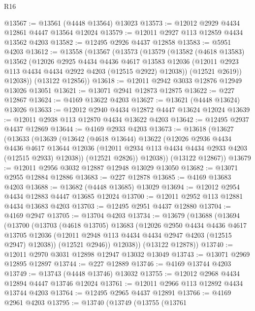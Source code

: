 \begin{lexlean}{R16}
\begin{coremodule}
@13567 := @13561 (@4448 @13564) @13023
@13573 := @12012 @2929 @4434 @12861 @4447 @13564 @12024
@13579 := @12011 @2927 @113 @12859 @4434 @13562 @4203
@13582 := @12495 @2926 @4437 @12858
@13583 := @5951 @4203
@13612 := @13558
    (@13567
      (@13573
        (@13579
          (@13582
            (@4618 @13583)
            @13562
            (@12026
              @2925
              @4434
              @4436
              @4617
              @13583
              @12036
              (@12011 @2923 @113 @4434 @4434 @2922 @4203 (@12515 @2922) @12038))
            (@12521 @2619))
          @12038))
      (@13122 @12856))
@13618 := @12011 @2942 @3033 @12876 @12949 @13026 @13051
@13621 := @13071 @2941 @12873 @12875
@13622 := @227 @12867
@13624 := @4169 @13622 @4203
@13627 := @13621 (@4448 @13624) @13026
@13633 := @12012 @2940 @4434 @12872 @4447 @13624 @12024
@13639 := @12011 @2938 @113 @12870 @4434 @13622 @4203
@13642 := @12495 @2937 @4437 @12869
@13644 := @4169 @2933 @4203
@13673 := @13618
    (@13627
      (@13633
        (@13639
          (@13642
            (@4618 @13644)
            @13622
            (@12026
              @2936
              @4434
              @4436
              @4617
              @13644
              @12036
              (@12011 @2934 @113 @4434 @4434 @2933 @4203 (@12515 @2933) @12038))
            (@12521 @2826))
          @12038))
      (@13122 @12867))
@13679 := @12011 @2956 @3032 @12887 @12948 @13029 @13050
@13682 := @13071 @2955 @12884 @12886
@13683 := @227 @12878
@13685 := @4169 @13683 @4203
@13688 := @13682 (@4448 @13685) @13029
@13694 := @12012 @2954 @4434 @12883 @4447 @13685 @12024
@13700 := @12011 @2952 @113 @12881 @4434 @13683 @4203
@13703 := @12495 @2951 @4437 @12880
@13704 := @4169 @2947
@13705 := @13704 @4203
@13734 := @13679
    (@13688
      (@13694
        (@13700
          (@13703
            (@4618 @13705)
            @13683
            (@12026
              @2950
              @4434
              @4436
              @4617
              @13705
              @12036
              (@12011 @2948 @113 @4434 @4434 @2947 @4203 (@12515 @2947) @12038))
            (@12521 @2946))
          @12038))
      (@13122 @12878))
@13740 := @12011 @2970 @3031 @12898 @12947 @13032 @13049
@13743 := @13071 @2969 @12895 @12897
@13744 := @227 @12889
@13746 := @4169 @13744 @4203
@13749 := @13743 (@4448 @13746) @13032
@13755 := @12012 @2968 @4434 @12894 @4447 @13746 @12024
@13761 := @12011 @2966 @113 @12892 @4434 @13744 @4203
@13764 := @12495 @2965 @4437 @12891
@13766 := @4169 @2961 @4203
@13795 := @13740
    (@13749
      (@13755
        (@13761

\end{coremodule}
\end{lexlean}
